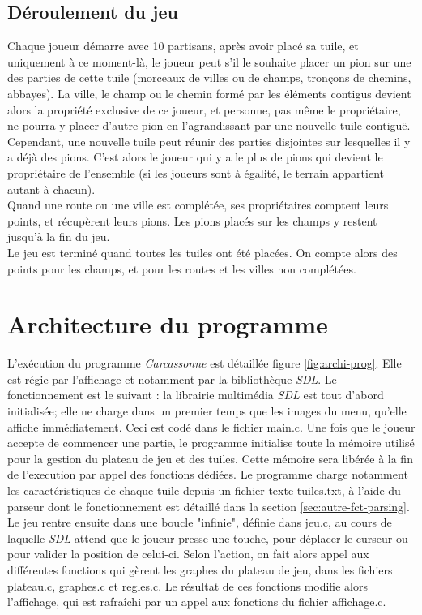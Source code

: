 \documentclass[a4paper, 11pt]{article}
\begin{document}
    
    \subsection{Déroulement du jeu}
	    Chaque joueur démarre avec 10 partisans, après avoir placé sa tuile, et uniquement à ce moment-là, le joueur peut s'il le souhaite placer un pion sur une des parties de cette tuile (morceaux de villes ou de champs, tronçons de chemins, abbayes). La ville, le champ ou le chemin formé par les éléments contigus devient alors la propriété exclusive de ce joueur, et personne, pas même le propriétaire, ne pourra y placer d'autre pion en l'agrandissant par une nouvelle tuile contiguë. Cependant, une nouvelle tuile peut réunir des parties disjointes sur lesquelles il y a déjà des pions. C'est alors le joueur qui y a le plus de pions qui devient le propriétaire de l'ensemble (si les joueurs sont à égalité, le terrain appartient autant à chacun).\\
	    \indent Quand une route ou une ville est complétée, ses propriétaires comptent leurs points, et récupèrent leurs pions. Les pions placés sur les champs y restent jusqu'à la fin du jeu.\\
	    \indent Le jeu est terminé quand toutes les tuiles ont été placées. On compte alors des points pour les champs, et pour les routes et les villes non complétées.

\newpage
 
 
 
\section{Architecture du programme}

\indent L'exécution du programme \emph{Carcassonne} est détaillée figure \ref{fig:archi-prog}. Elle est régie par l'affichage et notamment par la bibliothèque \emph{SDL}. Le fonctionnement est le suivant : la librairie multimédia \emph{SDL} est tout d'abord initialisée; elle ne charge dans un premier temps que les images du menu, qu'elle affiche immédiatement. Ceci est codé dans le fichier \textsf{main.c}. Une fois que le joueur accepte de commencer une partie, le programme initialise toute la mémoire utilisé pour la gestion du plateau de jeu et des tuiles. Cette mémoire sera libérée à la fin de l'execution par appel des fonctions dédiées. Le programme charge notamment les caractéristiques de chaque tuile depuis un fichier texte \textsf{tuiles.txt}, à l'aide du parseur dont le fonctionnement est détaillé dans la section \ref{sec:autre-fct-parsing}.\\
\indent Le jeu rentre ensuite dans une boucle "infinie", définie dans \textsf{jeu.c}, au cours de laquelle \emph{SDL} attend que le joueur presse une touche, pour déplacer le curseur ou pour valider la position de celui-ci. Selon l'action, on fait alors appel aux différentes fonctions qui gèrent les graphes du plateau de jeu, dans les fichiers \textsf{plateau.c}, \textsf{graphes.c} et \textsf{regles.c}. Le résultat de ces fonctions modifie alors l'affichage, qui est rafraîchi par un appel aux fonctions du fichier \textsf{affichage.c}.
\end{document}
